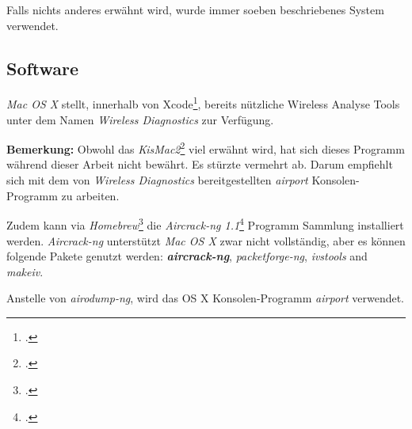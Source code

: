 Falls nichts anderes erwähnt wird, wurde immer soeben beschriebenes System verwendet.


\subsection{Software}
\textit{Mac OS X} stellt, innerhalb von Xcode\footcite{Xcode_Apple_Developer_2015-04-06}, bereits nützliche Wireless Analyse Tools unter dem Namen \textit{Wireless Diagnostics} zur Verfügung.

\begin{framed}
	\textbf{Bemerkung:} Obwohl das \textit{KisMac2}\footcite{IGR_Software_KisMac2_2015-04-06} viel erwähnt wird, hat sich dieses Programm während dieser Arbeit nicht bewährt. Es stürzte vermehrt ab.
	Darum empfiehlt sich mit dem von \textit{Wireless Diagnostics} bereitgestellten \textit{airport} Konsolen-Programm zu arbeiten.
\end{framed}

Zudem kann via \textit{Homebrew}\footcite{Homebrew__The_missing_package_manager_for_OS_X_2015-04-06} die \textit{Aircrack-ng 1.1}\footcite{Aircrack-ng_2015-04-06} Programm Sammlung installiert werden.
\textit{\textit{Aircrack-ng}} unterstützt \textit{Mac OS X} zwar nicht vollständig, aber es können folgende Pakete genutzt werden: \textbf{\textit{aircrack-ng}}, \textit{packetforge-ng}, \textit{ivstools} and \textit{makeiv}.

Anstelle von \textit{airodump-ng}, wird das OS X Konsolen-Programm \textit{airport} verwendet.
